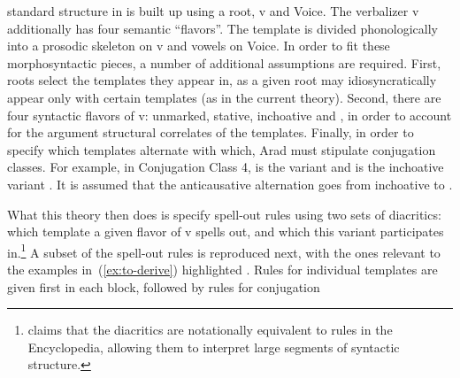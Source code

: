 \begin{exe}
\begin{xlist}
\begin{xlist}
\begin{exe}
\begin{xlist}
\begin{xlist}
\begin{exe}
\begin{xlist}
\begin{xlist}
\begin{exe}
\begin{exe}
\begin{xlist}
\begin{exe}
\begin{exe}
\begin{xlist}
\begin{exe}
\begin{exe}
\begin{exe}
\begin{exe}
\begin{exe}
\begin{xlist}
\begin{exe}
\begin{xlist}
\begin{exe}
\begin{exe}
\begin{xlist}
\begin{exe}
\begin{xlist}
\begin{exe}
\begin{xlist}
\begin{exe}
\begin{exe}
\begin{exe}
\begin{xlist}
\begin{exe}
\begin{exe}
\begin{exe}
\begin{xlist}
\begin{exe}
\begin{xlist}
\begin{exe}
\begin{xlist}
\begin{exe}
\begin{xlist}
\begin{exe}
\begin{exe}
\begin{exe}
\begin{exe}
\begin{xlist}
\begin{exe}
\begin{xlist}
\begin{exe}
\begin{xlist}
\begin{exe}
\begin{xlist}
\begin{exe}
\begin{xlist}
\begin{exe}
\begin{xlist}
\begin{exe}
\begin{exe}
\begin{exe}
\begin{exe}
\begin{xlist}
\begin{exe}
\begin{xlist}
\begin{exe}
\begin{xlist}
\begin{exe}
\begin{exe}
\begin{xlist}
\begin{exe}
\begin{xlist}
\begin{exe}
\begin{exe}
\begin{exe}
\begin{exe}
\begin{xlist}
\begin{xlist}
\begin{exe}
\begin{xlist}
\begin{exe}
\begin{exe}
\begin{exe}
\begin{xlist}
\begin{exe}
\begin{exe}
\begin{xlist}
\begin{exe}
\begin{exe}
\begin{exe}
\begin{xlist}
\begin{xlist}
\begin{exe}
\begin{xlist}
\begin{exe}
\begin{exe}
\begin{exe}
\begin{exe}
\begin{xlist}
\begin{exe}
\begin{xlist}
\begin{exe}
\begin{xlist}
\begin{exe}
\begin{xlist}
\begin{exe}
\begin{exe}
\begin{exe}
\begin{exe}
\begin{exe}
\begin{exe}
\begin{xlist}
\begin{exe}
\begin{xlist}
\begin{exe}
\begin{xlist}
\begin{exe}
\begin{xlist}
\begin{exe}
\begin{xlist}
\begin{exe}
\begin{xlist}
\begin{exe}
\begin{xlist}
\begin{exe}
\begin{xlist}
standard structure in \cite{arad05} is built up using a root, v and Voice. The verbalizer v additionally has four semantic ``flavors''. The template is divided phonologically into a prosodic skeleton on v and vowels on Voice. In order to fit these morphosyntactic pieces, a number of additional assumptions are required. First, roots select the templates they appear in, as a given root may idiosyncratically appear only with certain templates (as in the current theory). Second, there are four syntactic flavors of v: unmarked, stative, inchoative and , in order to account for the argument structural correlates of the templates. Finally, in order to specify which templates alternate with which, Arad must stipulate conjugation classes. For example, in Conjugation Class 4, {\tpie} is the  variant and {\thit} is the inchoative variant \citep[220]{arad05}. It is assumed that the anticausative alternation goes from inchoative to .
		
What this theory then does is specify spell-out rules using two sets of diacritics: which template a given flavor of v spells out, and which  this variant participates in.\footnote{\citet[227ff41]{arad05} claims that the diacritics are notationally equivalent to rules in the Encyclopedia, allowing them to interpret large segments of syntactic structure.} A subset of the spell-out rules is reproduced next, with the ones relevant to the examples in~(\ref{ex:to-derive}) highlighted \citep[230--231]{arad05}. Rules for individual templates are given first in each block, followed by rules for conjugation 
\end{xlist}
\end{exe}
\end{xlist}
\end{exe}
\end{xlist}
\end{exe}
\end{xlist}
\end{exe}
\end{xlist}
\end{exe}
\end{xlist}
\end{exe}
\end{xlist}
\end{exe}
\end{xlist}
\end{exe}
\end{exe}
\end{exe}
\end{exe}
\end{exe}
\end{exe}
\end{xlist}
\end{exe}
\end{xlist}
\end{exe}
\end{xlist}
\end{exe}
\end{xlist}
\end{exe}
\end{exe}
\end{exe}
\end{exe}
\end{xlist}
\end{exe}
\end{xlist}
\end{xlist}
\end{exe}
\end{exe}
\end{exe}
\end{xlist}
\end{exe}
\end{exe}
\end{xlist}
\end{exe}
\end{exe}
\end{exe}
\end{xlist}
\end{exe}
\end{xlist}
\end{xlist}
\end{exe}
\end{exe}
\end{exe}
\end{exe}
\end{xlist}
\end{exe}
\end{xlist}
\end{exe}
\end{exe}
\end{xlist}
\end{exe}
\end{xlist}
\end{exe}
\end{xlist}
\end{exe}
\end{exe}
\end{exe}
\end{exe}
\end{xlist}
\end{exe}
\end{xlist}
\end{exe}
\end{xlist}
\end{exe}
\end{xlist}
\end{exe}
\end{xlist}
\end{exe}
\end{xlist}
\end{exe}
\end{exe}
\end{exe}
\end{exe}
\end{xlist}
\end{exe}
\end{xlist}
\end{exe}
\end{xlist}
\end{exe}
\end{xlist}
\end{exe}
\end{exe}
\end{exe}
\end{xlist}
\end{exe}
\end{exe}
\end{exe}
\end{xlist}
\end{exe}
\end{xlist}
\end{exe}
\end{xlist}
\end{exe}
\end{exe}
\end{xlist}
\end{exe}
\end{xlist}
\end{exe}
\end{exe}
\end{exe}
\end{exe}
\end{exe}
\end{xlist}
\end{exe}
\end{exe}
\end{xlist}
\end{exe}
\end{exe}
\end{xlist}
\end{xlist}
\end{exe}
\end{xlist}
\end{xlist}
\end{exe}
\end{xlist}
\end{xlist}
\end{exe}
